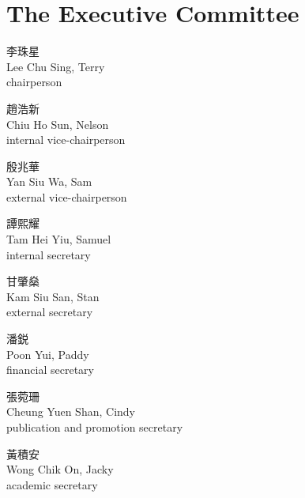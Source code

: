 \phantom{-}
\vfill

\section{The Executive Committee}
\start
\setupwhitespace[big]
\startitemize
\item {\switchtobodyfont[sourcehan]李珠星} \\
Lee Chu Sing, Terry \\
{ chairperson}
\item {\switchtobodyfont[sourcehan]趙浩新} \\
Chiu Ho Sun, Nelson \\
{ internal vice-chairperson}
\item {\switchtobodyfont[sourcehan]殷兆華} \\
Yan Siu Wa, Sam \\
{ external vice-chairperson}
\item {\switchtobodyfont[sourcehan]譚熙耀} \\
Tam Hei Yiu, Samuel \\
{ internal secretary}
\item {\switchtobodyfont[sourcehan]甘肇燊} \\
Kam Siu San, Stan \\
{ external secretary}
\item {\switchtobodyfont[sourcehan]潘鋭} \\
Poon Yui, Paddy \\
{ financial secretary}
\item {\switchtobodyfont[sourcehan]張菀珊} \\
Cheung Yuen Shan, Cindy \\
{ publication and promotion secretary}
\item {\switchtobodyfont[sourcehan]黃積安} \\
Wong Chik On, Jacky \\
{ academic secretary}
\stopitemize
\stop

\vfill
\phantom{-}

\pagebreak
